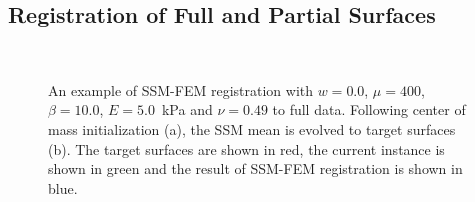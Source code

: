 \documentclass[journal]{IEEEtran}
\begin{document}
\subsection{Registration of Full and Partial Surfaces}\label{sec:exp1}
\begin{figure}[t]
	\centering
	\\
	\caption{An example of SSM-FEM registration with $w=0.0$, $\mu=400$, $\beta=10.0$, $E=5.0$~kPa and $\nu=0.49$ to full data. Following center of mass initialization (a), the SSM mean is evolved to target surfaces (b). The target surfaces are shown in red, the current instance is shown in green and the result of SSM-FEM registration is shown in blue.}\label{fig:RegFull}
\end{figure}
\end{document}

